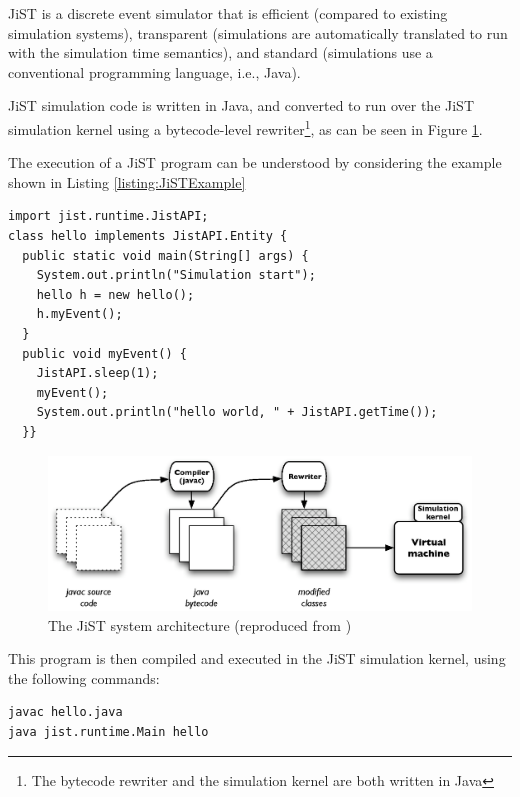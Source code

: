 JiST \cite{barr_JIST:2005} is a discrete event simulator that is 
efficient (compared to existing simulation systems), 
transparent (simulations are automatically translated to run with the 
simulation time semantics), and standard (simulations use a
conventional programming language, i.e., Java).

JiST simulation code is written in Java, and converted to run over the JiST 
simulation kernel using a bytecode-level rewriter\footnote{The bytecode 
rewriter and the simulation kernel are both written in Java},  as can be
seen in Figure \ref{Fig:JiST_architecture}.

The execution of a JiST program can be understood by considering the example 
shown in Listing \ref{listing:JiSTExample}

\begin{lstlisting}[frame=trbl, basewidth={0.55em, 0.6em}, captionpos=b, 
basicstyle=\ttfamily\footnotesize, breaklines, caption = Example JiST program (reproduced from \cite{barr_JIST:2005}, label = listing:JiSTExample]  
import jist.runtime.JistAPI;  
class hello implements JistAPI.Entity { 
  public static void main(String[] args) { 
    System.out.println("Simulation start"); 
    hello h = new hello(); 
    h.myEvent(); 
  } 
  public void myEvent() { 
    JistAPI.sleep(1); 
    myEvent(); 
    System.out.println("hello world, " + JistAPI.getTime()); 
  }} 
\end{lstlisting}

\begin{figure}
\centering
\includegraphics[width=\textwidth]{img/JiST_architecture.eps} 
\caption[The JiST System Architecture]{The JiST system architecture (reproduced from
\cite{barr_JIST:2005})}
\label{Fig:JiST_architecture}
\end{figure}  
 
This program is then compiled and executed in the JiST simulation
kernel, using the following commands:

  
\begin{lstlisting}[frame=trbl, basewidth={0.55em, 0.6em}, captionpos=b, 
basicstyle=\ttfamily\footnotesize, breaklines, caption = Execution of the
program in the JiST, label = listing:JiST ]  
javac hello.java
java jist.runtime.Main hello
\end{lstlisting}


